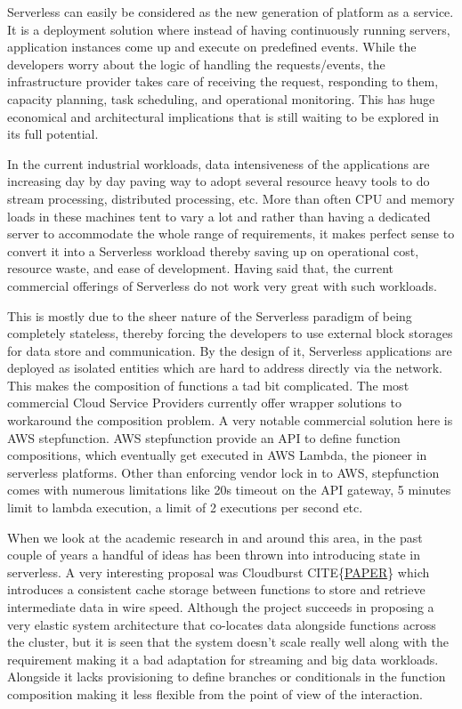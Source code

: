 \documentclass[12pt,titlepage]{article}
\begin{document}
Serverless can easily be considered as the new generation of platform as a
service. It is a deployment solution where instead of having continuously
running servers, application instances come up and execute on predefined events.
While the developers worry about
the logic of handling the requests/events, the infrastructure provider takes
care of receiving the request, responding to them, capacity planning, task
scheduling, and operational monitoring\cite{gotoconf}.
This has huge economical and architectural implications that is
still waiting to be explored in its full potential. 

In the current industrial workloads, data intensiveness of the applications are increasing
day by day paving way to adopt several resource heavy tools to do stream
processing, distributed processing, etc. More than often CPU and memory loads in
these machines tent to vary a lot and rather than having a dedicated server to accommodate the whole range
of requirements, it makes perfect sense to convert it into a Serverless workload
thereby saving up on operational cost, resource waste, and ease of development.
Having said that, the current commercial offerings of Serverless do not work
very great with such workloads.

This is mostly due to the sheer
nature of the Serverless paradigm of being completely stateless, thereby forcing
the developers to use external block storages for data store and communication.
By the design of it, Serverless applications are deployed as isolated entities
which are hard to address directly via the network. This makes the composition
of functions a tad bit complicated. The most commercial Cloud Service Providers
currently offer wrapper solutions to workaround the composition problem. A very
notable commercial solution here is AWS stepfunction. AWS stepfunction provide
an API to define function compositions, which eventually get executed in AWS
Lambda, the pioneer in serverless platforms. Other than enforcing vendor lock in
to AWS, stepfunction comes with numerous limitations like 20s timeout on the API
gateway, 5 minutes limit to lambda execution, a limit of 2 executions per second
etc. 

When we look at the academic research in and around this area, in the past
couple of years a handful of ideas has been thrown into introducing state in
serverless. A very interesting proposal was Cloudburst CITE\{\href{https://arxiv.org/abs/2001.04592}{PAPER}\} which
introduces a consistent cache storage between functions to store and retrieve
intermediate data in wire speed. Although the project succeeds in proposing a
very elastic system architecture that co-locates data alongside functions across
the cluster, but it is seen that the system doesn't scale really well along with
the requirement making it a bad adaptation for streaming and big data workloads.
Alongside it lacks provisioning to define branches or conditionals in the function
composition making it less flexible from the point of view of the interaction.
\end{document}
